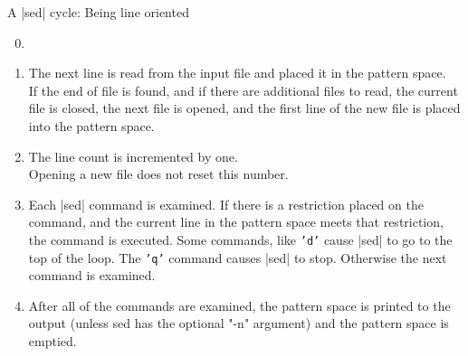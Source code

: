 \begin{frame}{A \bash|sed| cycle: Being line oriented}
    \vspace{-1mm}
    \begin{overlayarea}{\textwidth}{0.26\textheight}
        \begin{enumerate}
            \setcounter{enumi}{-1}
            \item<only@0> %
            \item<only@2> The next line is read from the input file and placed it in the pattern space.\\
                          If the end of file is found, and if there are additional files to read, the current file is closed, the next file is opened, and the first line of the new file is placed into the pattern space.
            \item<only@3> The line count is incremented by one.\\
                          Opening a new file does not reset this number.
            \item<only@4> Each \bash|sed| command is examined.
                          If there is a restriction placed on the command, and the current line in the pattern space meets that restriction, the command is executed.
                          Some commands, like \texttt{'d'} cause \bash|sed| to go to the top of the loop.
                          The \texttt{'q'} command causes \bash|sed| to stop.
                          Otherwise the next command is examined.
            \item<only@5> After all of the commands are examined, the pattern space is printed to the output (unless sed has the optional "-n" argument) and the pattern space is emptied.
        \end{enumerate}%
    \end{overlayarea}
    \begin{center}
\end{center}
\end{frame}
